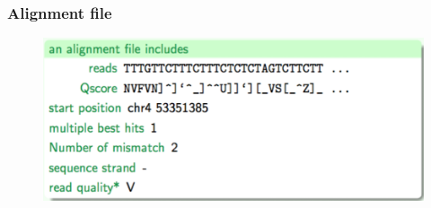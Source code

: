 \begin{frame}
\frametitle{Alignment file}

        \begin{figure}
                \includegraphics[width=\textwidth]{Pics/mapping_file.png}
        \end{figure}

\end{frame}





